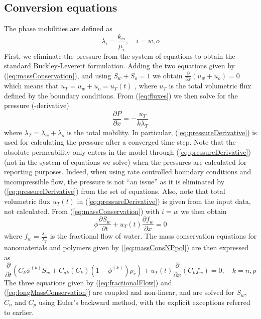 \documentclass[energies,article,submit,moreauthors,pdftex]{Definitions/mdpi}
\begin{document}
\subsection{Conversion equations}
The phase mobilities are defined as
\begin{equation}
    \lambda_i = \frac{k_{ri}}{\mu_i}, \quad i=w,o
\end{equation}
First, we eliminate the pressure from the system of equations to obtain the standard Buckley-Leverett formulation. Adding the two equations given by (\ref{eq:massConservation}), and using $S_w+S_o=1$ we obtain $\frac{\partial}{\partial x}(u_w+u_o)=0$  which means that $u_T=u_w+u_o=u_T(t)$  , where $u_T$ is the total volumetric flux defined by the boundary conditions. From (\ref{eq:fluxes}) we then solve for the pressure (-derivative)
\begin{equation} \label{eq:pressureDerivative} %
    \frac{\partial P}{\partial x} = -\frac{u_T}{k\lambda_T}
\end{equation}
where  $\lambda_T=\lambda_w+\lambda_o$ is the total mobility. In particular, (\ref{eq:pressureDerivative}) is used for calculating the pressure after a converged time step. Note that the absolute permeability only enters in the model through (\ref{eq:pressureDerivative}) (not in the system of equations we solve) when the pressures are calculated for reporting purposes. Indeed, when using rate controlled boundary conditions and incompressible flow, the pressure is not “an issue” as it is eliminated by (\ref{eq:pressureDerivative}) from the set of equations. Also, note that total volumetric flux $u_T(t)$ in (\ref{eq:pressureDerivative}) is given from the input data, not calculated. From (\ref{eq:massConservation}) with  $i=w$ we then obtain
\begin{equation} \label{eq:fractionalFlow} %
    \phi\frac{\partial S_w}{\partial t}+u_T(t)\frac{\partial f_w}{\partial x} = 0
\end{equation}
where $f_w=\frac{\lambda_w}{\lambda_T}$ is the fractional flow of water. The mass conservation equations for nanomaterials and polymers given by (\ref{eq:massConsNPpol}) are then expressed as
\begin{equation} \label{eq:longMassConservation} %
    \frac{\partial}{\partial t}\left( C_k\phi^{(k)}S_w + C_{ak}(C_k)(1-\phi^{(k)}) \rho_r \right) + u_T(t) \frac{\partial}{\partial x}(C_k f_w)=0, \quad k=n,p
\end{equation}
The three equations given by (\ref{eq:fractionalFlow}) and (\ref{eq:longMassConservation}) are coupled and non-linear, and are solved for $S_w$, $C_n$ and $C_p$  using Euler’s backward method, with the explicit exceptions referred to earlier.
\end{document}
